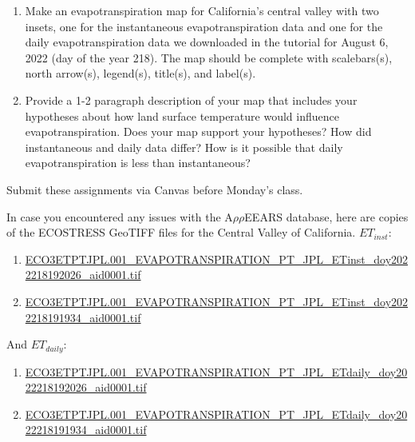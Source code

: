\documentclass[oneside,a4paper,11pt,explicit]{book}
\begin{document}
\begin{tcolorbox}[colback=yellow!5!white,colframe=IceCreamOrbit,title= \vspace{.2em} \Large Map of the Week Assignments]
	\large
	\begin{enumerate}
		\item Make an evapotranspiration map for California's central valley with two insets, one for the instantaneous evapotranspiration data and one for the daily evapotranspiration data we downloaded in the tutorial for August 6, 2022 (day of the year 218). The map should be complete with scalebars(s), north arrow(s), legend(s), title(s), and label(s). 
        \item Provide a 1-2 paragraph description of your map that includes your hypotheses about how land surface temperature would influence evapotranspiration. Does your map support your hypotheses? How did instantaneous and daily data differ? How is it possible that daily evapotranspiration is less than instantaneous?
	\end{enumerate}
	Submit these assignments via Canvas before Monday's class.
\end{tcolorbox}

\begin{tcolorbox}[colback=yellow!5!white,title=\textbf{Datafiles}]
	\large
	In case you encountered any issues with the A$\rho\rho$EEARS database, here are copies of the ECOSTRESS GeoTIFF files for the Central Valley of California. $ET_{inst}$:
	\begin{enumerate}
		\item \href{https://jeremydforsythe.github.io/icecream-tutorials/Tutorial6_Evaportranspiration1/ECO3ETPTJPL.001_EVAPOTRANSPIRATION_PT_JPL_ETinst_doy2022218192026_aid0001.tif}{\small ECO3ETPTJPL.001\_EVAPOTRANSPIRATION\_PT\_JPL\_ETinst\_doy2022218192026\_aid0001.tif}
		\item \href{https://jeremydforsythe.github.io/icecream-tutorials/Tutorial6_Evaportranspiration1/ECO3ETPTJPL.001_EVAPOTRANSPIRATION_PT_JPL_ETinst_doy2022218191934_aid0001.tif}{\small ECO3ETPTJPL.001\_EVAPOTRANSPIRATION\_PT\_JPL\_ETinst\_doy2022218191934\_aid0001.tif}
	\end{enumerate}
	And $ET_{daily}$:
	\begin{enumerate}
		\item \href{https://jeremydforsythe.github.io/icecream-tutorials/Tutorial6_Evaportranspiration1/ECO3ETPTJPL.001_EVAPOTRANSPIRATION_PT_JPL_ETdaily_doy2022218192026_aid0001.tif}{\small ECO3ETPTJPL.001\_EVAPOTRANSPIRATION\_PT\_JPL\_ETdaily\_doy2022218192026\_aid0001.tif}
		\item \href{https://jeremydforsythe.github.io/icecream-tutorials/Tutorial6_Evaportranspiration1/ECO3ETPTJPL.001_EVAPOTRANSPIRATION_PT_JPL_ETdaily_doy2022218191934_aid0001.tif
}{\small ECO3ETPTJPL.001\_EVAPOTRANSPIRATION\_PT\_JPL\_ETdaily\_doy2022218191934\_aid0001.tif}
	\end{enumerate}
\end{tcolorbox}
\end{document}
